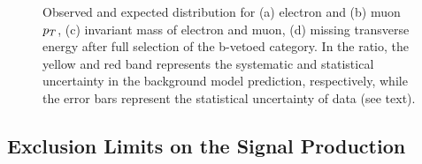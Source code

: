 \begin{figure}[!hp]
\begin{center}
{	}
    \end{center}
    \caption{ Observed and expected distribution for (a) electron and (b) muon $p_{T}$, (c) invariant mass of electron and muon, (d) missing transverse energy
	after full selection of the b-vetoed category.
	 In the ratio, the yellow and red band represents the systematic and statistical uncertainty in the background model prediction, 
	respectively,  while the error bars represent the statistical uncertainty of data (see text).}
   \label{fig:somefinaldistro2}
\end{figure}


\subsection{Exclusion Limits on the Signal Production}


